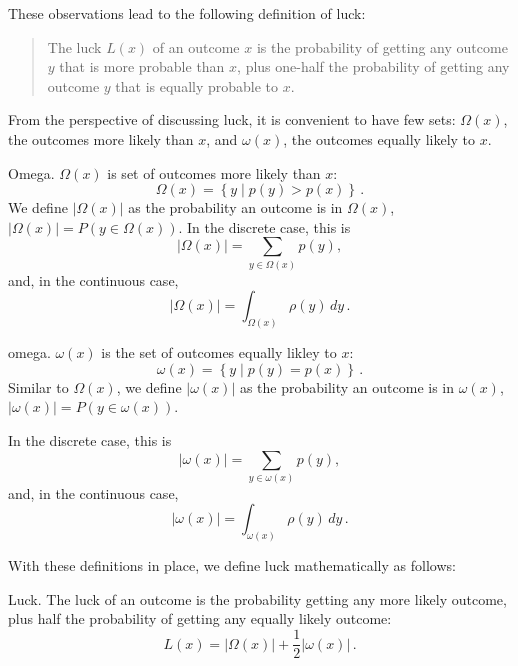 These observations lead to the following definition of luck:
\begin{quote}
The luck $L(x)$ of an outcome $x$ is the probability of getting any outcome $y$ that is more probable than $x$, plus one-half the probability of getting any outcome $y$ that is equally probable to $x$.
\end{quote}

From the perspective of discussing luck, it is convenient to have few sets: $\Omega(x)$, the outcomes more likely than $x$, and $\omega(x)$, the outcomes equally likely to $x$.

\begin{definition}{Omega.}  $\Omega(x)$ is set of outcomes more likely than $x$:
\begin{equation}
\Omega(x) = \left\{ y \mid p(y)>p(x) \right\} \,.
\end{equation}
We define $|\Omega(x)|$ as the probability an outcome is in $\Omega(x)$,
$|\Omega(x)| = P(y\in\Omega(x))$.  In the discrete case, this is
\begin{equation}
|\Omega(x)| = \sum_{y \in \Omega(x)} p(y),
\end{equation}
and, in the continuous case,
\begin{equation}
|\Omega(x)| = \int_{\Omega(x)} \rho(y)\,dy \,.
\end{equation}
\end{definition}

\begin{definition}{omega.}
$\omega(x)$ is the set of outcomes equally likley to $x$:
\begin{equation}
\omega(x) = \left\{ y \mid p(y)=p(x) \right\} \,.
\end{equation}
Similar to $\Omega(x)$, we define $|\omega(x)|$ as the probability an outcome is in $\omega(x)$,
$|\omega(x)| = P(y\in\omega(x))$.  

In the discrete case, this is
\begin{equation}
|\omega(x)| = \sum_{y \in \omega(x)} p(y),
\end{equation}
and, in the continuous case,
\begin{equation}
|\omega(x)| = \int_{\omega(x)} \rho(y)\,dy \,.
\end{equation}
\end{definition}

With these definitions in place, we define luck mathematically as follows:
\begin{definition}{Luck.}  The luck of an outcome is the probability getting any more likely outcome, plus half the probability of getting any equally likely outcome:
\begin{equation}
L(x)=|\Omega(x)| + \frac{1}{2} |\omega(x)| \,.
\end{equation}
\end{definition}


